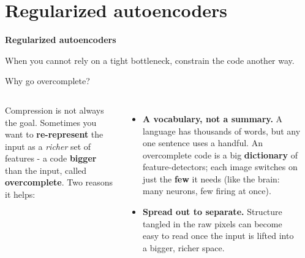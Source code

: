 \documentclass[aspectratio=169]{beamer}
\begin{document}
\section{Regularized autoencoders}

\begin{frame}[plain]
  \vfill
  \begin{center}
    {\Large\color{popblue}\textbf{Regularized autoencoders}}\\[0.9em]
    \begin{minipage}{0.82\textwidth}\centering\small
      When you cannot rely on a tight bottleneck, constrain the code another way.
    \end{minipage}
  \end{center}
  \vfill
\end{frame}

\begin{frame}{Why go overcomplete?}
  \begin{columns}[T]
    \small
    Compression is not always the goal. Sometimes you want to \textbf{re-represent} the input as a
    \emph{richer} set of features - a code \textbf{bigger} than the input, called
    \textbf{overcomplete}. Two reasons it helps:
    \vskip 4pt
    \begin{itemize}
      \item \textbf{A vocabulary, not a summary.} A language has thousands of words, but any one
        sentence uses a handful. An overcomplete code is a big \textbf{dictionary} of
        feature-detectors; each image switches on just the \textbf{few} it needs (like the brain:
        many neurons, few firing at once).
      \item \textbf{Spread out to separate.} Structure tangled in the raw pixels can become easy to
        read once the input is lifted into a bigger, richer space.
    \end{itemize}
    \begin{center}
    \end{center}
  \end{columns}
\end{frame}
\end{document}
